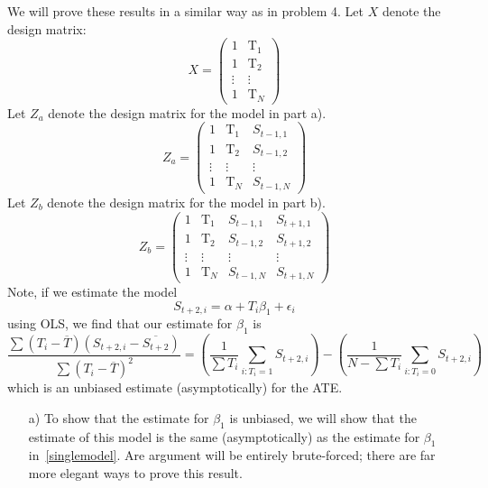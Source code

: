 \documentclass{article}
\begin{document}
\begin{itemize}
    We will prove these results in a similar way as in problem 4.
    Let $X$ denote the design matrix:
    $$
      X = \left(
        \begin{array}{cc} 
          1 & \text{T}_1\\
          1 & \text{T}_2  \\
          \vdots & \vdots \\
          1 & \text{T}_N    
        \end{array}
      \right)
    $$
    Let $Z_a$ denote the design matrix for the model in part a).
    $$
      Z_a = \left(
        \begin{array}{ccc} 
          1 & \text{T}_1 & S_{t-1,1}\\
          1 & \text{T}_2  & S_{t-1,2}\\
          \vdots & \vdots & \vdots \\
          1 & \text{T}_N    & S_{t-1,N}
        \end{array}
      \right)
    $$
    Let $Z_b$ denote the design matrix for the model in part b).
    $$
      Z_b = \left(
        \begin{array}{cccc} 
          1 & \text{T}_1 & S_{t-1,1} & S_{t+1,1}\\
          1 & \text{T}_2  & S_{t-1,2} & S_{t+1,2}\\
          \vdots & \vdots & \vdots & \vdots\\
          1 & \text{T}_N    & S_{t-1,N}& S_{t+1,N}
        \end{array}
      \right)
    $$
    Note, if we estimate the model
    \begin{equation}
      S_{t+2,i} = \alpha + T_i\beta_1 + \epsilon_i
      \label{singlemodel}
    \end{equation}
    using OLS, we find that our estimate for $\beta_1$ is
    $$
     \frac{\sum(T_i - \overline T)(S_{t+2,i} - \overline {S_{t+2}})}{\sum(T_i - \overline T)^2} =\left(\frac{1}{\sum T_i} \sum_{i : T_i = 1} S_{t+2,i}\right) - \left(\frac{1}{N- \sum T_i} \sum_{i: T_i = 0} S_{t+2,i}\right)
    $$
    which is an unbiased estimate (asymptotically) for the ATE.
    \begin{itemize}
    \item[a)] 
      To show that the estimate for $\beta_1$ is unbiased, 
      we will show that the estimate of this model is the same (asymptotically)
      as the estimate for $\beta_1$ in~\ref{singlemodel}. 
      Are argument will be entirely brute-forced; there are far more elegant ways 
      to prove this result.\\[1ex]

\end{itemize}
\end{itemize}
\end{document}
